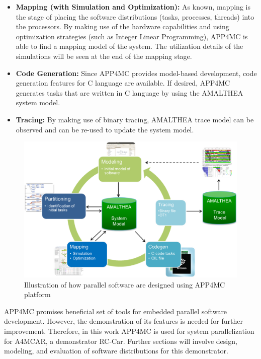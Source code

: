 \begin{itemize}
	\item \textbf{Mapping (with Simulation and Optimization):} As known, mapping is the stage of placing the software distributions (tasks, processes, threads) into the processors. By making use of the hardware capabilities and using optimization strategies (such as Integer Linear Programming), APP4MC is able to find a mapping model of the system. The utilization details of the simulations will be seen at the end of the mapping stage.
	\item \textbf{Code Generation:} Since APP4MC provides model-based development, code generation features for C language are available. If desired, APP4MC generates tasks that are written in C language by using the AMALTHEA system model.
	\item \textbf{Tracing:} By making use of binary tracing, AMALTHEA trace model can be observed and can be re-used to update the system model.
\end{itemize}

\begin{figure}[!ht]
	\centering
	\captionsetup{justification=centering}
	\includegraphics[width=\textwidth]{content/images/app4mcdesign.png}
	\caption{Illustration of how parallel software are designed using APP4MC platform \cite{amalthea4publicweb}}
	\label{fig:app4mcdesign}
\end{figure}
APP4MC promises beneficial set of tools for embedded parallel software development. However, the demonstration of its features is needed for further improvement. Therefore, in this work APP4MC is used for system parallelization for A4MCAR, a demonstrator RC-Car. Further sections will involve design, modeling, and evaluation of software distributions for this demonstrator.


